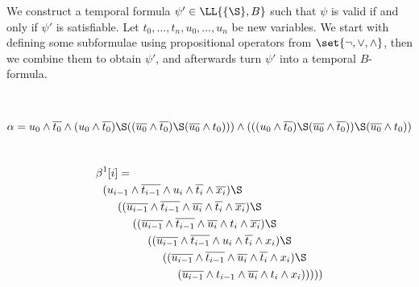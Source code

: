         We construct a temporal formula $\psi'\in \LL{\{\S\},B}$ such that $\psi$ is valid if and only if $\psi'$ is satisfiable. Let $t_0,\dots,t_n,u_0,\dots,u_n$ be new variables. We start with defining some subformulae using propositional operators from $\set{\neg,\vee,\wedge}$, then we combine them to obtain $\psi'$, and afterwards turn $\psi'$ into a temporal $B$-formula.

        \begin{small}
          ~\par\vspace{-1.3\baselineskip}
          \begin{equation*}
              \alpha= u_0\wedge\overline{t_0}
                  \wedge(u_0\wedge\overline{t_0})\S((
                  \overline{u_0}\wedge\overline{t_0})\S(\overline{u_0}\wedge t_0)))
                  \wedge(((u_0\wedge\overline{t_0})\S(
                  \overline{u_0}\wedge\overline{t_0}))\S(\overline{u_0}\wedge t_0))
          \end{equation*}
          ~\par\vspace{-1.0\baselineskip}
          \begin{minipage}{.52\textwidth}
            \begin{equation*} \begin{split}
              \beta&^1[i] =\\ \ & (u_{i-1}\wedge\overline{t_{i-1}}\wedge u_i\wedge\overline{t_i}\wedge \overline{x_i})
            \S \\
            & \ \ \ \
            ((\overline{u_{i-1}}\wedge\overline{t_{i-1}}\wedge\overline{u_i}\wedge\overline{t_i}\wedge \overline{x_i})
            \S \\
            & \ \ \ \ \ \ \ \
            ((\overline{u_{i-1}}\wedge\overline{t_{i-1}}\wedge\overline{u_i}\wedge t_i\wedge \overline{x_i})
            \S \\
            & \ \ \ \ \ \ \ \ \ \ \ \
            ((\overline{u_{i-1}}\wedge\overline{t_{i-1}}\wedge u_i\wedge\overline{t_i}\wedge x_i)
            \S \\
            & \ \ \ \ \ \ \ \ \ \ \ \ \ \ \ \
            ((\overline{u_{i-1}}\wedge\overline{t_{i-1}}\wedge\overline{u_i}\wedge\overline{t_i}\wedge x_i)
            \S \\
            & \ \ \ \ \ \ \ \ \ \ \ \ \ \ \ \ \ \ \ \
            (\overline{u_{i-1}}\wedge t_{i-1}\wedge\overline{u_i}\wedge t_i\wedge x_i )))))
            \end{split}\end{equation*}

\end{minipage}
\end{small}
